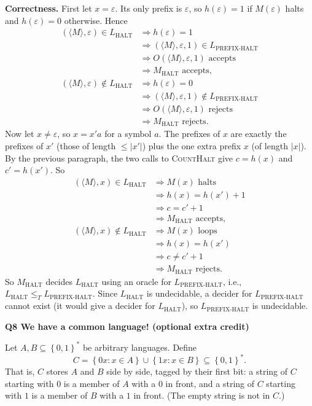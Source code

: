 \documentclass[11pt]{article}
\newcommand{\set}[1]{\left\{#1\right\}}
\newcommand{\abs}[1]{\left|#1\right|}
\newcommand{\inner}[1]{\langle #1 \rangle}
\newcommand{\algo}[1]{\textsc{#1}}
\newcommand{\lT}{\leq_T}
\newcommand{\Lh}{L_{\text{HALT}}}
\newcommand{\Lph}{L_{\text{PREFIX-HALT}}}
\newcommand{\qpage}[1]{\clearpage\noindent\textbf{\large #1}\par\medskip}
\begin{document}
\textbf{Correctness.}
First let $x = \varepsilon$.
Its only prefix is $\varepsilon$, so $h(\varepsilon) = 1$ if $M(\varepsilon)$ halts and $h(\varepsilon) = 0$ otherwise.
Hence
\begin{align*}
  (\inner{M}, \varepsilon) \in \Lh &\Longrightarrow h(\varepsilon) = 1 \\
  &\Longrightarrow (\inner{M}, \varepsilon, 1) \in \Lph \\
  &\Longrightarrow O(\inner{M}, \varepsilon, 1) \text{ accepts} \\
  &\Longrightarrow M_{\text{HALT}} \text{ accepts}, \\[0.5em]
  (\inner{M}, \varepsilon) \notin \Lh &\Longrightarrow h(\varepsilon) = 0 \\
  &\Longrightarrow (\inner{M}, \varepsilon, 1) \notin \Lph \\
  &\Longrightarrow O(\inner{M}, \varepsilon, 1) \text{ rejects} \\
  &\Longrightarrow M_{\text{HALT}} \text{ rejects}.
\end{align*}
Now let $x \ne \varepsilon$, so $x = x' a$ for a symbol $a$.
The prefixes of $x$ are exactly the prefixes of $x'$ (those of length $\le \abs{x'}$) plus the one extra prefix $x$ (of length $\abs{x}$).
By the previous paragraph, the two calls to \algo{CountHalt} give $c = h(x)$ and $c' = h(x')$.
So
\begin{align*}
  (\inner{M}, x) \in \Lh &\Longrightarrow M(x) \text{ halts} \\
  &\Longrightarrow h(x) = h(x') + 1 \\
  &\Longrightarrow c = c' + 1 \\
  &\Longrightarrow M_{\text{HALT}} \text{ accepts}, \\[0.5em]
  (\inner{M}, x) \notin \Lh &\Longrightarrow M(x) \text{ loops} \\
  &\Longrightarrow h(x) = h(x') \\
  &\Longrightarrow c \ne c' + 1 \\
  &\Longrightarrow M_{\text{HALT}} \text{ rejects}.
\end{align*}
So $M_{\text{HALT}}$ decides $\Lh$ using an oracle for $\Lph$, i.e., $\Lh \lT \Lph$.
Since $\Lh$ is undecidable, a decider for $\Lph$ cannot exist (it would give a decider for $\Lh$), so $\Lph$ is undecidable.

\qpage{Q8 We have a common language! (optional extra credit)}

Let $A, B \subseteq \set{0,1}^*$ be arbitrary languages.
Define
\[
  C = \set{0x : x \in A} \cup \set{1x : x \in B} \subseteq \set{0,1}^*.
\]
That is, $C$ stores $A$ and $B$ side by side, tagged by their first bit: a string of $C$ starting with $0$ is a member of $A$ with a $0$ in front, and a string of $C$ starting with $1$ is a member of $B$ with a $1$ in front.
(The empty string is not in $C$.)
\end{document}
